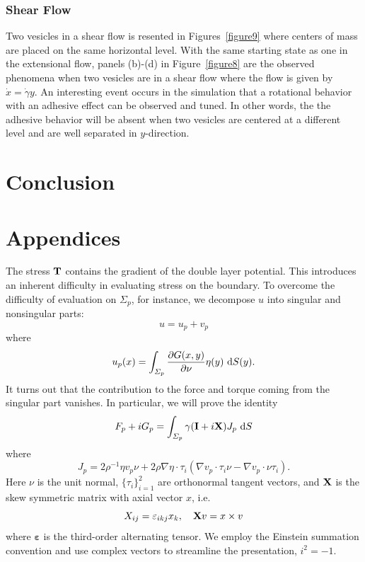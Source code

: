 \documentclass[lineno]{jfm}
\begin{document}
\subsubsection{Shear Flow}
Two vesicles in a shear flow is resented in Figures~\ref{figure9} where centers of mass are placed on the same horizontal level. With the same starting state as one in the extensional flow, panels (b)-(d) in Figure~\ref{figure8} are the observed phenomena when two vesicles are in a shear flow where the flow is given by $\dot x = \dot\gamma y$. 
An interesting event occurs in the simulation that a rotational behavior with an adhesive effect can be observed and tuned. In other words, the the adhesive behavior will be absent when two vesicles are centered 
at a different level and are well separated in $y$-direction.



\section{\label{conclusion}Conclusion}


\begin{acknowledgments}
\end{acknowledgments}

\appendix

\section{Appendices}
The stress ${\bf T}$ contains the gradient of the double layer potential. This 
introduces an inherent difficulty in evaluating stress on the boundary.
To overcome the difficulty of evaluation on $\Sigma_p$, for instance, we decompose $u$ into singular and nonsingular parts:
\begin{equation}
u = u_p + v_p
\end{equation}
where  
\begin{equation}
u_p(x) = \int_{\Sigma_p} \frac{\partial G(x,y)}{\partial \nu} \eta(y) \,\dif S(y).
\end{equation}
It turns out that the contribution to the force and torque coming from the singular
part vanishes. In particular, we will prove the identity
\begin{equation}
\label{eq:recipforcetorque}
F_p + iG_p= \int_{\Sigma_p} \gamma ({\bf I}+i{\bf X})J_{p} \,\dif S
\end{equation}
where
 \begin{equation}
\label{eq:jumpstress1}
J_{p} = 2\rho^{-1} \eta  v_p \nu 
+ 2\rho \nabla \eta \cdot \tau_i(\nabla v_p \cdot \tau_i \nu -  \nabla v_p \cdot \nu \tau_i).
\end{equation}
Here $\nu$ is the unit normal, $\{\tau_i\}_{i=1}^2$ are orthonormal tangent vectors,
and ${\bf X}$ is the skew symmetric matrix with axial vector $x$, i.e.
\[X_{ij} = \varepsilon_{ikj}x_k,\quad {\bf X}v = x\times v\]
where $\boldsymbol{\varepsilon}$ is the third-order alternating tensor.
We employ the Einstein summation convention and use complex vectors to streamline the presentation, $i^2 = -1$.
\end{document}
